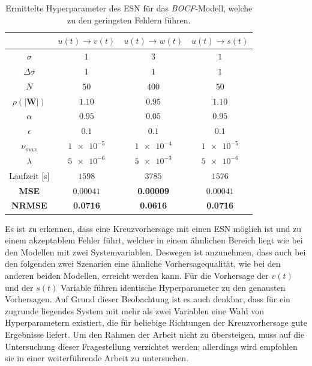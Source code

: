 \begin{table}[h]
	\centering
	\captionsetup{width=0.9\linewidth}
	\begin{tabular}{cccc}
		\hline		
		\multicolumn{1}{c}{} &  $u(t) \rightarrow v(t)$ & $u(t) \rightarrow w(t)$ & $u(t) \rightarrow s(t)$\\ 
		\hline 
		\rule[-1ex]{0pt}{2.5ex} $\sigma$ & $1$ & $3$ & $1$\\ 
		\rule[-1ex]{0pt}{2.5ex} $\Delta \sigma$ & $1$ & $1$ & $1$ \\ 
		\rule[-1ex]{0pt}{3.5ex} $N$ & $50$ & $400$ & $50$ \\ 
		\rule[-1ex]{0pt}{3.5ex} $\rho(|\mathbf{W}|)$ & $1.10$ & $0.95$ & $1.10$\\ 
		\rule[-1ex]{0pt}{3.5ex} $\alpha$ & $0.95$ & $0.05$ & $0.95$ \\ 
		\rule[-1ex]{0pt}{3.5ex} $\epsilon$ & $0.1$ & $0.1$ & $0.1$ \\ 
		\rule[-1ex]{0pt}{3.5ex} $\nu_{max}$ & $\num{1e-5}$ & $\num{1e-4}$ & $\num{1e-5}$\\ 
		\rule[-1ex]{0pt}{3.5ex} $\lambda$ & $\num{5e-6}$ & $\num{5e-3}$ & $\num{5e-6}$\\ 
		\rule[-1ex]{0pt}{2.5ex} Laufzeit [s] & $1598$ & $3785$ & $1576$ \\ 
		\rule[-1ex]{0pt}{2.5ex} \textbf{MSE} & \textbf{$\num{0.00041}$} & \textbf{0.00009} & $0.00041$ \\ 
		\rule[-1ex]{0pt}{2.5ex} \textbf{NRMSE} & \textbf{0.0716} & \textbf{0.0616} & \textbf{0.0716} \\ 
		\hline 
	\end{tabular} 
	\caption{Ermittelte Hyperparameter des \textsc{ESN} für das \textit{BOCF}-Modell, welche zu den geringsten Fehlern führen.}
	\label{tab:exp_cross_bocf_results}
\end{table}

Es ist zu erkennen, dass eine Kreuzvorhersage mit einen \textsc{ESN} möglich ist und zu einem akzeptablem Fehler führt, welcher in einem ähnlichen Bereich liegt wie bei den Modellen mit zwei Systemvariablen. Deswegen ist anzunehmen, dass auch bei den folgenden zwei Szenarien eine ähnliche Vorhersagequalität, wie bei den anderen beiden Modellen, erreicht werden kann. Für die Vorhersage der $v(t)$ und der $s(t)$ Variable führen identische Hyperparameter zu den genausten Vorhersagen. Auf Grund dieser Beobachtung ist es auch denkbar, dass für ein zugrunde liegendes System mit mehr als zwei Variablen eine Wahl von Hyperparametern existiert, die für beliebige Richtungen der Kreuzvorhersage gute Ergebnisse liefert. Um den Rahmen der Arbeit nicht zu übersteigen, muss auf die Untersuchung dieser Fragestellung verzichtet werden; allerdings wird empfohlen sie in einer weiterführende Arbeit zu untersuchen.\\ 


